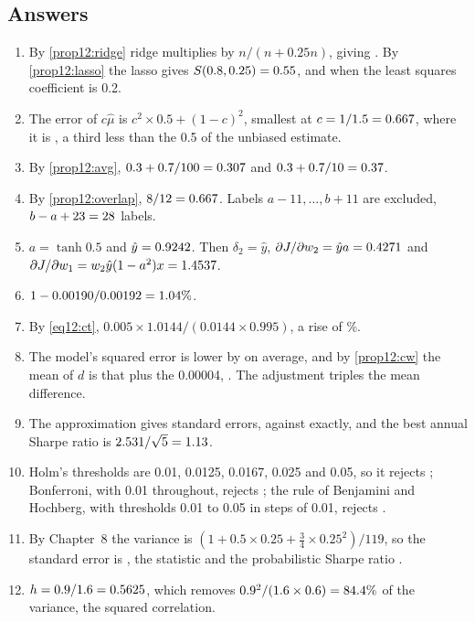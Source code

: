 \begin{chapterrefs}
\subsection*{Answers}
\begin{enumerate}[label=\textbf{12.\arabic*}, leftmargin=*]
  \item By \cref{prop12:ridge} ridge multiplies by $n/(n+0.25n)$, giving \zaRidge. By \cref{prop12:lasso} the
  lasso gives $S(0.8,0.25)=0.55$, and \zaLassoSmall{} when the least squares coefficient is 0.2.
  \item The error of $c\hat\mu$ is $c^2\times0.5+(1-c)^2$, smallest at $c=1/1.5=0.667$, where it is \zbMse,
  a third less than the 0.5 of the unbiased estimate.
  \item By \cref{prop12:avg}, $0.3+0.7/100=0.307$ and $0.3+0.7/10=0.37$.
  \item By \cref{prop12:overlap}, $8/12=0.667$. Labels $a-11,\dots,b+11$ are excluded, $b-a+23=28$ labels.
  \item $a=\tanh0.5$ and $\hat y=0.9242$. Then $\delta_2=\hat y$, $\partial J/\partial w_2=\hat ya=0.4271$ and
  $\partial J/\partial w_1=w_2\hat y(1-a^2)x=1.4537$.
  \item $1-0.00190/0.00192=1.04\%$.
  \item By \cref{eq12:ct}, $0.005\times1.0144/(0.0144\times0.995)$, a rise of \zgGain\%.
  \item The model's squared error is lower by \zhGap{} on average, and by \cref{prop12:cw} the mean of $d$
  is that plus the 0.00004, \zhAdj. The adjustment triples the mean difference.
  \item The approximation gives \ziMax{} standard errors, against \ziExact{} exactly, and the best annual
  Sharpe ratio is $2.531/\sqrt5=1.13$.
  \item Holm's thresholds are 0.01, 0.0125, 0.0167, 0.025 and 0.05, so it rejects \zjHolm; Bonferroni,
  with 0.01 throughout, rejects \zjBonf; the rule of Benjamini and Hochberg, with thresholds 0.01 to 0.05 in
  steps of 0.01, rejects \zjBh.
  \item By Chapter~8 the variance is $(1+0.5\times0.25+\tfrac34\times0.25^2)/119$, so the standard error is
  \zkSe, the statistic \zkZ{} and the probabilistic Sharpe ratio \zkPsr.
  \item $h=0.9/1.6=0.5625$, which removes $0.9^2/(1.6\times0.6)=84.4\%$ of the variance, the squared
  correlation.
\end{enumerate}

\FloatBarrier

\end{chapterrefs}
